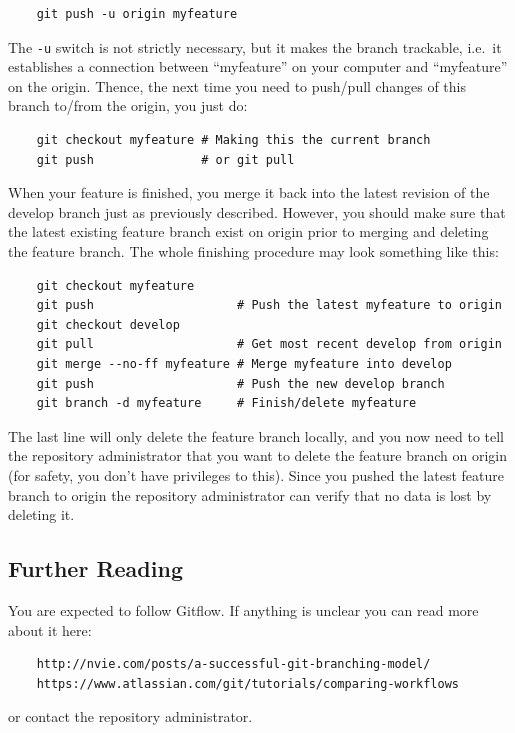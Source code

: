 \documentclass[10pt,a4paper]{article}
\begin{document}
\begin{verbatim}
	git push -u origin myfeature
\end{verbatim}
The \verb$-u$ switch is not strictly necessary, but it makes the branch trackable, i.e.\ it establishes a connection between ``myfeature'' on your computer and ``myfeature'' on the origin. Thence, the next time you need to push/pull changes of this branch to/from the origin, you just do:

\begin{verbatim}
	git checkout myfeature # Making this the current branch
	git push               # or git pull
\end{verbatim}
When your feature is finished, you merge it back into the latest revision of the develop branch just as previously described. However, you should make sure that the latest existing feature branch exist on origin prior to merging and deleting the feature branch. The whole finishing procedure may look something like this:

\begin{verbatim}
	git checkout myfeature
	git push                    # Push the latest myfeature to origin
	git checkout develop
	git pull                    # Get most recent develop from origin
	git merge --no-ff myfeature # Merge myfeature into develop
	git push                    # Push the new develop branch
	git branch -d myfeature     # Finish/delete myfeature
\end{verbatim}
The last line will only delete the feature branch locally, and you now need to tell the repository administrator that you want to delete the feature branch on origin (for safety, you don't have privileges to this). Since you pushed the latest feature branch to origin the repository administrator can verify that no data is lost by deleting it.

\subsection{Further Reading}
You are expected to follow Gitflow. If anything is unclear you can read more about it here:
\begin{verbatim}
	http://nvie.com/posts/a-successful-git-branching-model/
	https://www.atlassian.com/git/tutorials/comparing-workflows
\end{verbatim}
or contact the repository administrator.
\end{document}
